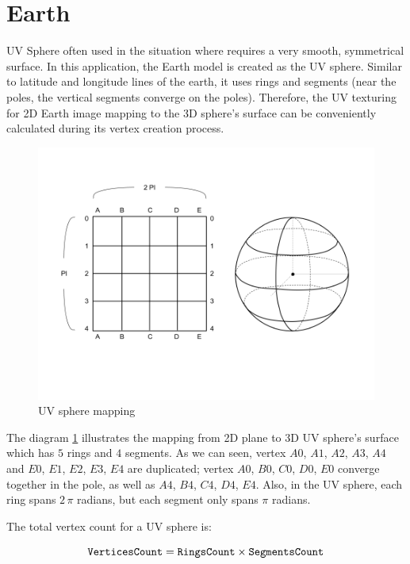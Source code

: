 \section{Earth}

UV Sphere often used in the situation where requires a very smooth, symmetrical surface. In this application, the Earth model is created as the UV sphere. Similar to latitude and longitude lines of the earth, it uses rings and segments (near the poles, the vertical segments converge on the poles). Therefore, the UV texturing for 2D Earth image mapping to the 3D sphere's surface can be conveniently calculated during its vertex creation process.

\begin{figure}[H]
\caption{UV sphere mapping}
\label{fig:uv-sphere-mapping}
\centering
\includegraphics[width=\linewidth]{Figures/uv-sphere-mapping.png}
\decoRule
\end{figure}

The diagram \ref{fig:uv-sphere-mapping} illustrates the mapping from 2D plane to 3D UV sphere's surface which has $5$ rings and $4$ segments. As we can seen, vertex $A0$, $A1$, $A2$, $A3$, $A4$ and $E0$, $E1$, $E2$, $E3$, $E4$ are duplicated; vertex $A0$, $B0$, $C0$, $D0$, $E0$ converge together in the pole, as well as $A4$, $B4$, $C4$, $D4$, $E4$. Also, in the UV sphere, each ring spans $2\,\pi$ radians, but each segment only spans $\pi$ radians.

The total vertex count for a UV sphere is:

\begin{equation}
\label{equ:uv-sphere-vertices}
\texttt{VerticesCount} = \texttt{RingsCount} \times \texttt{SegmentsCount}
\end{equation}

